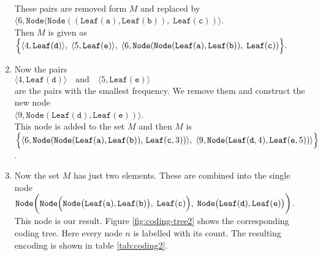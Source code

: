 \begin{enumerate}
      \\[0.2cm]
      These pairs are removed form $M$ and replaced by 
      \\[0.2cm]
      \hspace*{0.3cm}
      $ \langle 6, \texttt{Node}(
           \texttt{Node}((\texttt{Leaf}(\texttt{a}), \texttt{Leaf}(\texttt{b})),\; 
           \texttt{Leaf}(\texttt{c}))\rangle$. 
      \\[0.2cm]
      Then $M$ is given as
      \\[0.2cm]
      \hspace*{0.3cm}
      $ \Bigl\{ 
        \langle 4, \texttt{Leaf}(\texttt{d}) \rangle,\;\langle 5, \texttt{Leaf}(\texttt{e}) \rangle,\;
        \langle 6, \texttt{Node}(
           \texttt{Node}(\texttt{Leaf}(\texttt{a}), \texttt{Leaf}(\texttt{b})),\; 
           \texttt{Leaf}(\texttt{c}))\Bigr\}. $
\item Now the pairs
      \\[0.2cm]
      \hspace*{0.3cm}
      $ \langle 4, \texttt{Leaf}(\texttt{d}) \rangle \quad \mathrm{and} \quad \langle 5, \texttt{Leaf}(\texttt{e}) \rangle$
      \\[0.2cm]
      are the pairs with the smallest frequency.
      We remove them and construct the new node \\[0.2cm]
      \hspace*{0.3cm}
      $\langle 9, \texttt{Node}(\texttt{Leaf}(\texttt{d}), \texttt{Leaf}(\texttt{e})) \rangle$.
      \\[0.2cm]
      This node is added to the set  $M$ and then $M$ is
      \\[0.2cm]
      \hspace*{0.3cm}
      $ \Bigl\{ 
        \langle 6, \texttt{Node}(
           \texttt{Node}(\texttt{Leaf}(\texttt{a}),
           \texttt{Leaf}(\texttt{b})),\,\texttt{Leaf}(\texttt{c},3))
        \rangle,\;
        \langle 9,\texttt{Node}(\texttt{Leaf}(\texttt{d},4), \texttt{Leaf}(\texttt{e},5)) \rangle
        \Bigr\}
           $.      
\item Now the set $M$ has just two elements.  These are combined into the single node 
      \\[0.2cm]
      \hspace*{0.3cm}
      $\texttt{Node}\biggl(
              \texttt{Node}\Bigl(
                 \texttt{Node}\bigl(\texttt{Leaf}(\texttt{a}), \texttt{Leaf}(\texttt{b})\bigr),\; 
                 \texttt{Leaf}(\texttt{c})\Bigr),\;
              \texttt{Node}\bigl(\texttt{Leaf}(\texttt{d}), \texttt{Leaf}(\texttt{e})\bigr)
         \biggr)
      $.
      \\[0.2cm]
      This node is our result.  Figure 
      \ref{fig:coding-tree2} shows the corresponding coding tree.  Here every node $n$ is labelled with its
      count.  The resulting encoding is shown in table  \ref{tab:coding2}.
\end{enumerate}

